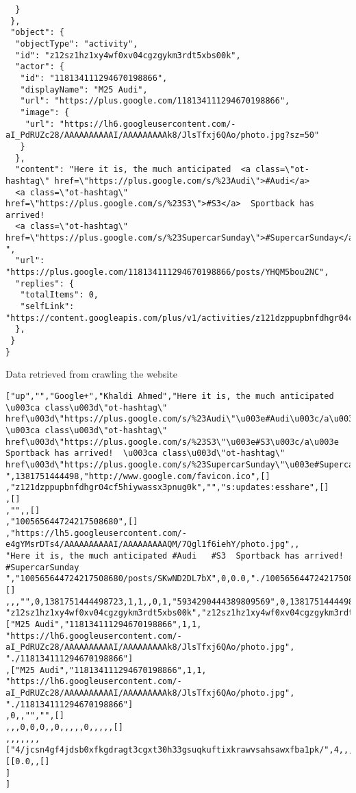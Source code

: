 \begin{itemize}
{\begin{verbatim}
  }
 },
 "object": {
  "objectType": "activity",
  "id": "z12sz1hz1xy4wf0xv04cgzgykm3rdt5xbs00k",
  "actor": {
   "id": "118134111294670198866",
   "displayName": "M25 Audi",
   "url": "https://plus.google.com/118134111294670198866",
   "image": {
    "url": "https://lh6.googleusercontent.com/-aI_PdRUZc28/AAAAAAAAAAI/AAAAAAAAAk8/JlsTfxj6QAo/photo.jpg?sz=50"
   }
  },
  "content": "Here it is, the much anticipated  <a class=\"ot-hashtag\" href=\"https://plus.google.com/s/%23Audi\">#Audi</a>
  <a class=\"ot-hashtag\" href=\"https://plus.google.com/s/%23S3\">#S3</a>  Sportback has arrived!  
  <a class=\"ot-hashtag\" href=\"https://plus.google.com/s/%23SupercarSunday\">#SupercarSunday</a>  ",
  "url": "https://plus.google.com/118134111294670198866/posts/YHQM5bou2NC",
  "replies": {
   "totalItems": 0,
   "selfLink": "https://content.googleapis.com/plus/v1/activities/z121dzppupbnfdhgr04cf5hiywassx3pnug0k/comments"
  },
 }
}
\end{verbatim}
\normalsize
Data retrieved from crawling the website
\tiny
\begin{verbatim}
["up","","Google+","Khaldi Ahmed","Here it is, the much anticipated  \u003ca class\u003d\"ot-hashtag\" 
href\u003d\"https://plus.google.com/s/%23Audi\"\u003e#Audi\u003c/a\u003e   \u003ca class\u003d\"ot-hashtag\" 
href\u003d\"https://plus.google.com/s/%23S3\"\u003e#S3\u003c/a\u003e  Sportback has arrived!  \u003ca class\u003d\"ot-hashtag\" 
href\u003d\"https://plus.google.com/s/%23SupercarSunday\"\u003e#SupercarSunday\u003c/a\u003e  ",1381751444498,"http://www.google.com/favicon.ico",[]
,"z121dzppupbnfdhgr04cf5hiywassx3pnug0k","","s:updates:esshare",[]
,[]
,"",,[]
,"100565644724217508680",[]
,"https://lh5.googleusercontent.com/-e4gYMsrDTs4/AAAAAAAAAAI/AAAAAAAAAQM/7Qgl1f6iehY/photo.jpg",,
"Here it is, the much anticipated #Audi   #S3  Sportback has arrived! #SupercarSunday  
","100565644724217508680/posts/SKwND2DL7bX",0,0.0,"./100565644724217508680",[]
,,,"",0,1381751444498723,1,1,,0,1,"5934290444389809569",0,1381751444498,
"z12sz1hz1xy4wf0xv04cgzgykm3rdt5xbs00k","z12sz1hz1xy4wf0xv04cgzgykm3rdt5xbs00k",0,,["M25 Audi","118134111294670198866",1,1,
"https://lh6.googleusercontent.com/-aI_PdRUZc28/AAAAAAAAAAI/AAAAAAAAAk8/JlsTfxj6QAo/photo.jpg",
"./118134111294670198866"]
,["M25 Audi","118134111294670198866",1,1,
"https://lh6.googleusercontent.com/-aI_PdRUZc28/AAAAAAAAAAI/AAAAAAAAAk8/JlsTfxj6QAo/photo.jpg",
"./118134111294670198866"]
,0,,"","",[]
,,,0,0,0,,0,,,,,0,,,,,[]
,,,,,,,["4/jcsn4gf4jdsb0xfkgdragt3cgxt30h33gsuqkuftixkrawvsahsawxfba1pk/",4,,,,,0.0,,,,,,[[0.0,,[]
]
]
\end{verbatim}
}
\end{itemize} 